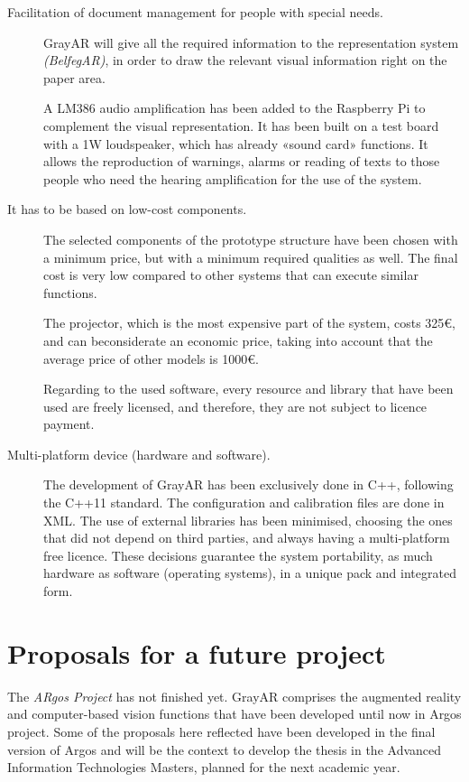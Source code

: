 \begin{description}
\item[Facilitation of document management for people with special needs.] GrayAR will give all the required information to the representation system \textit{(BelfegAR)}, in order to draw the relevant visual information right on the paper area.

A LM386 audio amplification has been added to the Raspberry Pi to complement the visual representation. It has been built on a test board with a 1W loudspeaker, which has already «sound card» functions. It allows the reproduction of
warnings, alarms or reading of texts to those people who need the hearing amplification for the use of the system.

\item [It has to be based on low-cost components.] The selected components of the prototype structure have been chosen with a minimum price, but with a minimum required qualities as well. The final cost is very low compared to other systems that can execute similar functions.

The projector, which is the most expensive part of the system, costs 325\euro, and can beconsiderate an economic price, taking into account that the average price of other models is 1000\euro.

Regarding to the used software, every resource and library that have been used are freely licensed, and therefore, they are not subject to licence payment.

\item [Multi-platform device (hardware and software).] The development of GrayAR has been exclusively done in C++, following the C++11 standard. The configuration and calibration files are done in XML. The use of external libraries has been minimised, choosing the ones that did not depend on third parties, and always having a multi-platform free licence. These decisions guarantee the system portability, as much hardware as software (operating systems), in a unique pack and integrated form.
\end{description}

\section{Proposals for a future project}
The \textit{ARgos Project} has not finished yet. GrayAR comprises the augmented reality and computer-based vision functions that have been developed until now in Argos project. Some of the proposals here reflected have been developed in the final version of Argos and will be the context to develop the thesis in the Advanced Information Technologies Masters, planned for the next academic year. 

